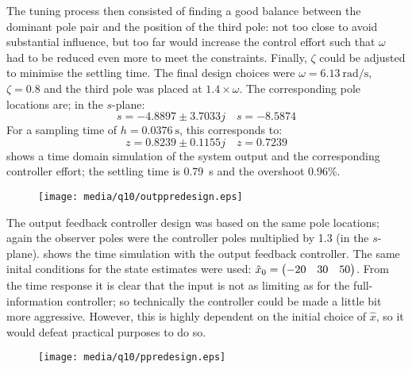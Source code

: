 The tuning process then consisted of finding a good balance between the dominant pole pair and the position of the third pole: not too close to avoid substantial influence, but too far would increase the control effort such that $\omega$ had to be reduced even more to meet the constraints. Finally, $\zeta$ could be adjusted to minimise the settling time. The final design choices were $\omega = \SI{6.13}{\radian\per\second}$, $\zeta = 0.8$ and the third pole was placed at $1.4\times\omega$. The corresponding pole locations are; in the $s$-plane:
$$ s = -4.8897 \pm 3.7033j  \quad s = -8.5874$$
For a sampling time of $h = \SI{0.0376}{\second}$, this corresponds to:
$$z = 0.8239 \pm 0.1155j \quad z = 0.7239$$
 shows a time domain simulation of the system output and the corresponding controller effort; the settling time is \SI{0.79}{\second} and the overshoot 0.96\%.
\begin{figure}[ht]
    \centering
    \texttt{[image: media/q10/outppredesign.eps]}
    \caption{}
    \label{fig:q10_ppredesign}
\end{figure}
The output feedback controller design was based on the same pole locations; again the observer poles were the controller poles multiplied by 1.3 (in the $s$-plane).  shows the time simulation with the output feedback controller. The same inital conditions for the state estimates were used: $\hat{x}_0 = \mqty(-20 & 30 & 50)$. From the time response it is clear that the input is not as limiting as for the full-information controller; so technically the controller could be made a little bit more aggressive. However, this is highly dependent on the initial choice of $\hat{x}$, so it would defeat practical purposes to do so.
\begin{figure}[ht]
    \centering
    \texttt{[image: media/q10/ppredesign.eps]}
    \caption{}
    \label{fig:q10_outppredesign}
\end{figure}
\FloatBarrier

